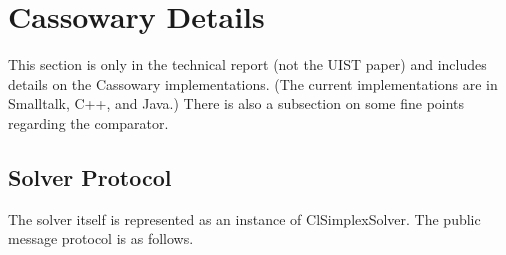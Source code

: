 \documentclass{article}
\begin{document}
\section{Cassowary Details}
\label{cassowary-details}

This section is only in the technical report (not the UIST paper) and
includes details on the Cassowary implementations.  (The current
implementations are in Smalltalk, C++, and Java.)  There is also a
subsection on some fine points regarding the comparator.

\subsection{Solver Protocol}
\label{solver-protocol}

The solver itself is represented as an instance of {\sf ClSimplexSolver}.
The public message protocol is as follows.
\end{document}
